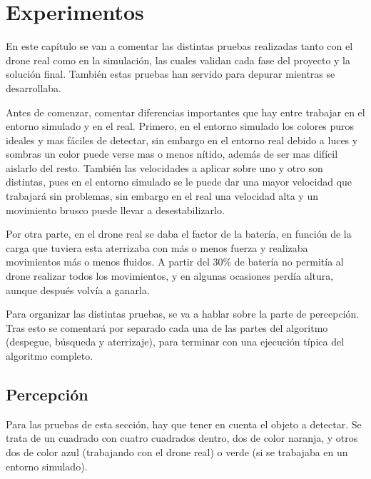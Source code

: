 \chapter{Experimentos}\label{cap.experimentos}
\hspace{1cm} En este cap\'itulo se van a comentar las distintas pruebas realizadas tanto con el drone real como en la simulaci\'on, las cuales validan cada fase del proyecto y la soluci\'on final. Tambi\'en estas pruebas han servido para depurar mientras se desarrollaba. 

\hspace{1cm} Antes de comenzar, comentar diferencias importantes que hay entre trabajar en el entorno simulado y en el real. Primero, en el entorno simulado los colores puros ideales y mas f\'aciles de detectar, sin embargo en el entorno real debido a luces y sombras un color puede verse mas o menos n\'itido, adem\'as de ser mas dif\'icil aislarlo del resto. Tambi\'en las velocidades a aplicar sobre uno y otro son distintas, pues en el entorno simulado se le puede dar una mayor velocidad que trabajar\'a sin problemas, sin embargo en el real una velocidad alta y un movimiento brusco puede llevar a desestabilizarlo. 

\hspace{1cm} Por otra parte, en el drone real se daba el factor de la bater\'ia, en funci\'on de la carga que tuviera esta aterrizaba con m\'as o menos fuerza y realizaba movimientos m\'as o menos fluidos. A partir del 30\% de bater\'ia no permit\'ia al drone realizar todos los movimientos, y en algunas ocasiones perd\'ia altura, aunque despu\'es volv\'ia a ganarla. 

\hspace{1cm} Para organizar las distintas pruebas, se va a hablar sobre la parte de percepci\'on. Tras esto se comentar\'a por separado cada una de las partes del algoritmo (despegue, b\'usqueda y aterrizaje), para terminar con una ejecuci\'on t\'ipica del algoritmo completo.

\section{Percepci\'on }\label{sec:percepcion}

\hspace{1cm} Para las pruebas de esta secci\'on, hay que tener en cuenta el objeto a detectar. Se trata de un cuadrado con cuatro cuadrados dentro, dos de color naranja, y otros dos de color azul (trabajando con el drone real) o verde (si se trabajaba en un entorno simulado). 

